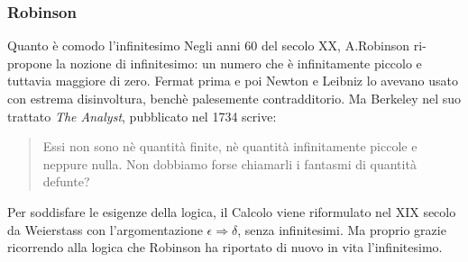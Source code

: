 \begin{frame}[label=Robinson]
  \frametitle{Robinson}
  \begin{block}{Quanto è comodo l'infinitesimo}
    Negli anni 60 del secolo XX, A.Robinson ri-propone la nozione di infinitesimo: un numero che è infinitamente piccolo
    e tuttavia maggiore di zero. Fermat prima e poi Newton e Leibniz lo avevano usato con estrema disinvoltura, benchè palesemente
    contradditorio. Ma Berkeley nel suo trattato \textit{The Analyst}, pubblicato nel 1734 scrive:
      \begin{quotation}
        Essi non sono nè quantità finite, nè quantità infinitamente piccole e neppure nulla. Non dobbiamo forse
        chiamarli i fantasmi di quantità defunte?
      \end{quotation}
      Per soddisfare le esigenze della logica, il Calcolo viene riformulato nel XIX secolo da Weierstass
      con l'argomentazione $\epsilon \Rightarrow  \delta$, senza infinitesimi. 
      Ma proprio grazie ricorrendo alla logica che Robinson ha riportato di nuovo in vita l'infinitesimo.
    \end{block}
\end{frame}

